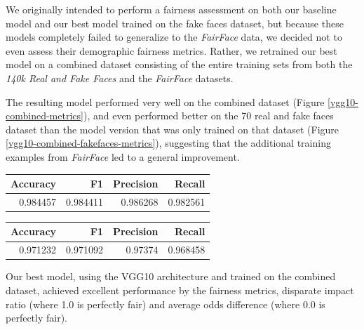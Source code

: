 \documentclass[11pt, letterpaper]{article}
\newenvironment{Figure}
  {\par\medskip\noindent\minipage{\linewidth}}
  {\endminipage\par\medskip}
\begin{document}
\begin{multicols}{2}
  We originally intended to perform a fairness assessment on both our baseline
  model and our best model trained on the fake faces dataset, but because
  these models completely failed to generalize to the \emph{FairFace} data,
  we decided not to even assess their demographic fairness metrics. Rather, we
  retrained our best model on a combined dataset consisting of the entire
  training sets from both the \emph{140k Real and Fake Faces} and the \emph{FairFace} datasets.

  The resulting model performed very well on the combined dataset (Figure
  \ref{vgg10-combined-metrics}), and even performed better on the 70 real and
  fake faces dataset than the model version that was only trained on that
  dataset (Figure \ref{vgg10-combined-fakefaces-metrics}), suggesting that the
  additional training examples from \emph{FairFace} led to a general improvement.

  \begin{Figure}
    \centering
    \label{vgg10-combined-metrics}
    \begin{tabular}{rrrr}
    \toprule
    Accuracy &        F1 &  Precision &    Recall \\
    \midrule
    0.984457 &  0.984411 &   0.986268 &  0.982561 \\
    \bottomrule
    \end{tabular}
  \end{Figure}

  \begin{Figure}
    \centering
    \label{vgg10-combined-fakefaces-metrics}
    \begin{tabular}{rrrr}
    \toprule
     Accuracy &        F1 &  Precision &    Recall \\
    \midrule
     0.971232 &  0.971092 &    0.97374 &  0.968458 \\
    \bottomrule
    \end{tabular}
    \end{Figure}

  Our best model, using the VGG10 architecture and trained on the combined
  dataset, achieved excellent performance by the fairness metrics, disparate
  impact ratio (where 1.0 is perfectly fair) and average odds difference
  (where 0.0 is perfectly fair).


\end{multicols}
\end{document}
